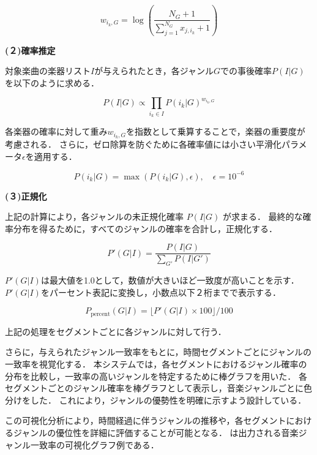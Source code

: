 \begin{equation}
	w_{i_k, G} = \log \left( \frac{N_G + 1}{\sum_{j=1}^{N_G} x_{j, i_k} + 1} \right)
\end{equation}

\textbf{(２)確率推定}

対象楽曲の楽器リスト$I$が与えられたとき，各ジャンル$G$での事後確率$P(I|G)$を以下のように求める．

\begin{equation}
	P(I|G) \propto \prod_{i_k \in I} P(i_k | G)^{w_{i_k, G}}
\end{equation}

各楽器の確率に対して重み$w_{i_k, G}$を指数として乗算することで，楽器の重要度が考慮される．
さらに，ゼロ除算を防ぐために各確率値には小さい平滑化パラメータ\( \epsilon \)を適用する．

\begin{equation}
	P(i_k | G) = \max (P(i_k | G), \epsilon), \quad \epsilon = 10^{-6}
\end{equation}

\textbf{(３)正規化}

上記の計算により，各ジャンルの未正規化確率 \( P(I|G) \) が求まる．
最終的な確率分布を得るために，すべてのジャンルの確率を合計し，正規化する．

\begin{equation}
	P'(G|I) = \frac{P(I|G)}{\sum_{G'} P(I|G')}
\end{equation}

$P'(G|I)$は最大値を1.0として，数値が大きいほど一致度が高いことを示す．
$P'(G|I)$をパーセント表記に変換し，小数点以下２桁までで表示する．

\begin{equation}
	P_{\text{percent}}(G|I) = \lfloor P'(G|I) \times 100 \rfloor / 100
\end{equation}

上記の処理をセグメントごとに各ジャンルに対して行う．

さらに，与えられたジャンル一致率をもとに，時間セグメントごとにジャンルの一致率を視覚化する．
本システムでは，各セグメントにおけるジャンル確率の分布を比較し，一致率の高いジャンルを特定するために棒グラフを用いた．
各セグメントごとのジャンル確率を棒グラフとして表示し，音楽ジャンルごとに色分けをした．
これにより，ジャンルの優勢性を明確に示すよう設計している．

この可視化分析により，時間経過に伴うジャンルの推移や，各セグメントにおけるジャンルの優位性を詳細に評価することが可能となる．
は出力される音楽ジャンル一致率の可視化グラフ例である．

